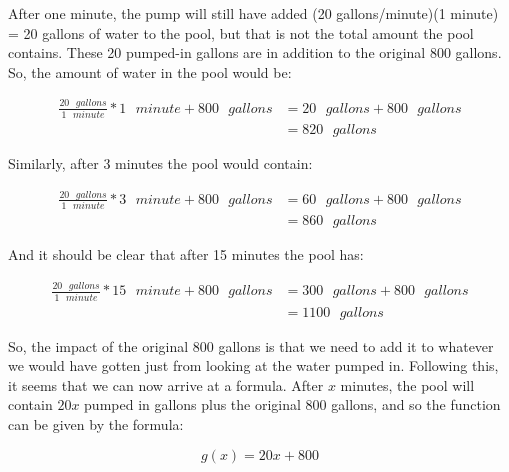 After one minute, the pump will still have added (20 gallons/minute)(1 minute) = 20 gallons of water to the pool, but that is not the total amount the pool contains. These 20 pumped-in gallons are in addition to the original 800 gallons. So, the amount of water in the pool would be:

\begin{align*}
	\frac{20 \text{ }gallons}{1 \text{ } minute}*1\text{ }minute + 800 \text{ }gallons &= 20\text{ }gallons + 800\text{ }gallons \\
	&=820\text{ }gallons
\end{align*}

Similarly, after 3 minutes the pool would contain:

\begin{align*}
	\frac{20 \text{ }gallons}{1 \text{ } minute}*3\text{ }minute + 800 \text{ }gallons &= 60\text{ }gallons + 800\text{ }gallons \\
	&=860\text{ }gallons
\end{align*}

And it should be clear that after 15 minutes the pool has:

\begin{align*}
	\frac{20 \text{ }gallons}{1 \text{ } minute}*15\text{ }minute + 800 \text{ }gallons &= 300\text{ }gallons + 800\text{ }gallons \\
	&=1100\text{ }gallons
\end{align*}

So, the impact of the original 800 gallons is that we need to add it to whatever we would have gotten just from looking at the water pumped in. Following this, it seems that we can now arrive at a formula. After $x$ minutes, the pool will contain $20x$ pumped in gallons plus the original $800$ gallons, and so the function can be given by the formula:

\begin{equation*}
	g(x)=20x+800
\end{equation*}



